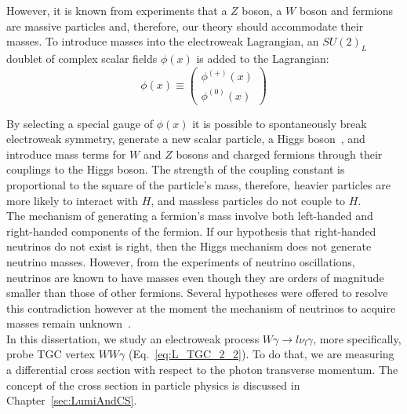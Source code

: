 However, it is known from experiments that a $Z$ boson, a $W$ boson and fermions are massive particles and, therefore, our theory should accommodate their masses. To introduce masses into the electroweak Lagrangian, an $SU(2)_L$ doublet of complex scalar fields $\phi(x)$ is added to the Lagrangian:\\

\begin{equation}\label{eq:H_doublet}
  \phi(x) \equiv \begin{pmatrix} \phi^{(+)}(x) \\ \phi^{(0)}(x) \end{pmatrix}
\end{equation}

By selecting a special gauge of $\phi(x)$ it is possible to spontaneously break electroweak symmetry, generate a new scalar particle, a Higgs boson~\cite{ref_Pich}, and introduce mass terms for $W$ and $Z$ bosons and charged fermions through their couplings to the Higgs boson. The strength of the coupling constant is proportional to the square of the particle's mass, therefore, heavier particles are more likely to interact with $H$, and massless particles do not couple to $H$.\\

The mechanism of generating a fermion's mass involve both left-handed and right-handed components of the fermion. If our hypothesis that right-handed neutrinos do not exist is right, then the Higgs mechanism does not generate neutrino masses. However, from the experiments of neutrino oscillations, neutrinos are known to have masses even though they are orders of magnitude smaller than those of other fermions. Several hypotheses were offered to resolve this contradiction however at the moment the mechanism of neutrinos to acquire masses remain unknown~\cite{ref_PDG}.\\

In this dissertation, we study an electroweak process $W\gamma \rightarrow l \nu_l \gamma$, more specifically, probe TGC vertex $WW\gamma$ (Eq.~\ref{eq:L_TGC_2_2}). To do that, we are measuring a differential cross section with respect to the photon transverse momentum. The concept of the cross section in particle physics is discussed in Chapter~\ref{sec:LumiAndCS}.\\

